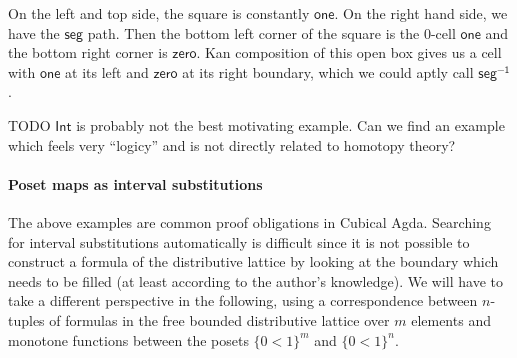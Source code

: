 \documentclass{llncs}
\newcommand{\todo}[1]{
  \begin{tcolorbox}
    TODO {#1} 
  \end{tcolorbox}
}
\newcommand{\cset}[1]{\ensuremath{\mathsf{{#1}}}}
\begin{document}
On the left and top side, the square is constantly \cset{one}. On the right hand
side, we have the \cset{seg} path. Then the bottom left corner of the square is
the 0-cell \cset{one} and the bottom right corner is \cset{zero}.
Kan composition of this open box gives us a cell with \cset{one} at its
left and \cset{zero} at its right boundary, which we could aptly call \cset{seg^{-1}}.


\todo{\cset{Int} is probably not the best motivating example. Can we find an example
  which feels very ``logicy'' and is not directly related to homotopy theory?}

\paragraph{Poset maps as interval substitutions}

The above examples are common proof obligations in Cubical Agda. Searching for
interval substitutions automatically is difficult since it is not possible to
construct a formula of the distributive lattice by looking at the boundary which
needs to be filled (at least according to the author's knowledge). We 
will have to take a different perspective in the following, using a
correspondence between $n$-tuples of formulas in the free bounded distributive
lattice over $m$ elements and monotone
functions between the posets  $\{ 0<1 \}^m$ and $\{ 0<1 \}^n$.

\end{document}
